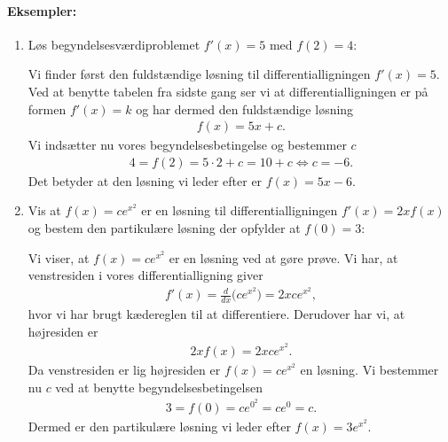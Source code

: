 \paragraph*{Eksempler:}
\begin{enumerate}
\item Løs begyndelsesværdiproblemet $f'(x)=5$ med $f(2)=4$:

Vi finder først den fuldstændige løsning til differentialligningen $f'(x)=5$. Ved at benytte tabelen fra sidste gang ser vi at differentialligningen er på formen $f'(x)=k$ og har dermed den fuldstændige løsning
\begin{align*}
f(x)=5x+c.
\end{align*}
Vi indsætter nu vores begyndelsesbetingelse og bestemmer $c$
\begin{align*}
4=f(2)=5 \cdot 2 + c = 10 + c \Leftrightarrow c = -6.
\end{align*}
Det betyder at den løsning vi leder efter er $f(x)=5x-6$.

\item Vis at  $f(x)=ce^{x^2}$ er en løsning til differentialligningen $f'(x)=2xf(x)$ og bestem den partikulære løsning der opfylder at $f(0)=3$:

Vi viser, at $f(x)=ce^{x^2}$ er en løsning ved at gøre prøve. Vi har, at venstresiden i vores differentialligning giver
\begin{align*}
f'(x) = \frac{d}{dx} \big(ce^{x^2}\big) = 2xce^{x^2},
\end{align*}
hvor vi har brugt kædereglen til at differentiere. Derudover har vi, at højresiden er
\begin{align*}
2xf(x)=2xce^{x^2}.
\end{align*}
Da venstresiden er lig højresiden er $f(x)=ce^{x^2}$ en løsning. Vi bestemmer nu $c$ ved at benytte begyndelsesbetingelsen
\begin{align*}
3=f(0)=ce^{0^2}=ce^0=c.
\end{align*}
Dermed er den partikulære løsning vi leder efter $f(x)=3e^{x^2}$.
\end{enumerate}


